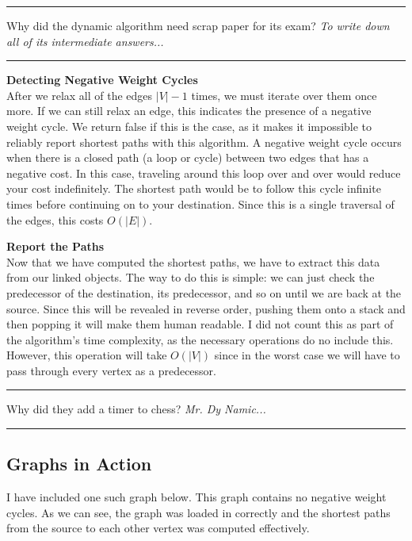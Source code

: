\documentclass[letterpaper, 10pt]{article}
\begin{document}
\hrule
\vspace{.25cm}
Why did the dynamic algorithm need scrap paper for its exam? \textit{To write down all of its intermediate answers...}
\vspace{.25cm}
\hrule 
\noindent\newline\newline
\textbf{Detecting Negative Weight Cycles} \\
\indent After we relax all of the edges $|V| - 1$ times, we must iterate over them once more. If we can still relax an edge, this indicates the presence of a negative weight cycle. We return false if this is the case, as it makes it impossible to reliably report shortest paths with this algorithm. A negative weight cycle occurs when there is a closed path (a loop or cycle) between two edges that has a negative cost. In this case, traveling around this loop over and over would reduce your cost indefinitely. The shortest path would be to follow this cycle infinite times before continuing on to your destination. Since this is a single traversal of the edges, this costs $O(|E|)$.



\noindent\newline
\textbf{Report the Paths} \\
\indent Now that we have computed the shortest paths, we have to extract this data from our linked objects. The way to do this is simple: we can just check the predecessor of the destination, its predecessor, and so on until we are back at the source. Since this will be revealed in reverse order, pushing them onto a stack and then popping it will make them human readable. I did not count this as part of the algorithm's time complexity, as the necessary operations do no include this. However, this operation will take $O(|V|)$ since in the worst case we will have to pass through every vertex as a predecessor. 


\hrule
\vspace{.25cm}
Why did they add a timer to chess? \textit{Mr. Dy Namic...}\\
\hrule
\subsection{Graphs in Action}
I have included one such graph below. This graph contains no negative weight cycles. As we can see, the graph was loaded in correctly and the shortest paths from the source to each other vertex was computed effectively. 

\end{document}
